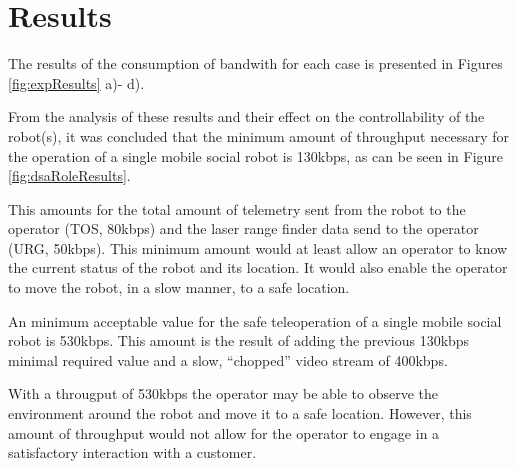 \documentclass[conference]{ieeeconf}
\begin{document}
\section{Results}
The results of the consumption of bandwith for each case is presented in Figures \ref{fig:expResults} a)- d).

From the analysis of these results and their effect on the controllability of the robot(s), it was concluded that the minimum amount of throughput necessary for the operation of a single mobile social robot is 130kbps, as can be seen in Figure \ref{fig:dsaRoleResults}.

This amounts for the total amount of telemetry sent from the robot to the operator (TOS, 80kbps) and the laser range finder data send to the operator (URG, 50kbps).
This minimum amount would at least allow an operator to know the current status of the robot and its location.
It would also enable the operator to move the robot, in a slow manner, to a safe location.

An minimum acceptable value for the safe teleoperation of a single mobile social robot is 530kbps.
This amount is the result of adding the previous 130kbps minimal required value and a slow, ``chopped'' video stream of 400kbps.

With a througput of 530kbps the operator may be able to observe the environment around the robot and move it to a safe location.
However, this amount of throughput would not allow for the operator to engage in a satisfactory interaction with a customer.
 
\end{document}
